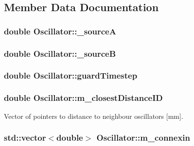 \subsection{Member Data Documentation}
\hypertarget{class_oscillator_a968627d069d5f0c44d8134718a01237f}{
\subsubsection[{\+\_\+source\+A}]{\setlength{\rightskip}{0pt plus 5cm}double Oscillator\+::\+\_\+source\+A}}\label{class_oscillator_a968627d069d5f0c44d8134718a01237f}
\hypertarget{class_oscillator_a5a144fd5dd7cbcbfc47d7c9013d330b8}{
\subsubsection[{\+\_\+source\+B}]{\setlength{\rightskip}{0pt plus 5cm}double Oscillator\+::\+\_\+source\+B}}\label{class_oscillator_a5a144fd5dd7cbcbfc47d7c9013d330b8}
\hypertarget{class_oscillator_a4db30c0516d078b69426aad65bf13022}{
\subsubsection[{guard\+Timestep}]{\setlength{\rightskip}{0pt plus 5cm}double Oscillator\+::guard\+Timestep}}\label{class_oscillator_a4db30c0516d078b69426aad65bf13022}
\hypertarget{class_oscillator_a85169bc0fa20530ed7a5e8089b572729}{
\subsubsection[{m\+\_\+closest\+Distance\+I\+D}]{\setlength{\rightskip}{0pt plus 5cm}double Oscillator\+::m\+\_\+closest\+Distance\+I\+D}}\label{class_oscillator_a85169bc0fa20530ed7a5e8089b572729}


Vector of pointers to distance to neighbour oscillators \mbox{[}mm\mbox{]}. 

\hypertarget{class_oscillator_a94d86971a2a425d2e2492962491dc01b}{
\subsubsection[{m\+\_\+connexin}]{\setlength{\rightskip}{0pt plus 5cm}std\+::vector$<$double$>$ Oscillator\+::m\+\_\+connexin}}\label{class_oscillator_a94d86971a2a425d2e2492962491dc01b}


